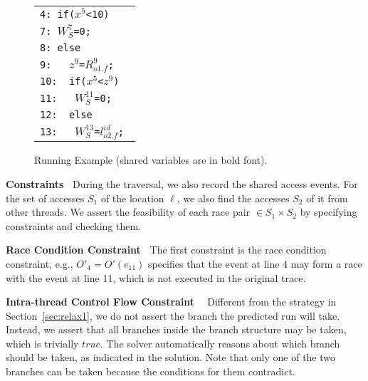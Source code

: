 \begin{figure}
\centering
\begin{tabular}{l}
 {\tt 4: if($x^5$<10)}  \\ %
{\tt 7: $W^7_{S}$=0;}   \\%
 {{\tt 8:  else}}   \\ %
 {{\tt 9: \ \ $z^9$=$R^{9}_{o1.f}$;}}  \\ %
 {{\tt 10: \ if($x^5$<$z^9$)}}  \\%
 {{\tt 11: \ \ $W^{11}_{S}$=0;}} \\%
 {{\tt 12: \ else }}  \\%
 {{\tt 13: \ \ $W^{13}_{S}$=$l^{id}_{o2.f}$; }}   \\%
\end{tabular}
\caption{Running Example (shared variables are in bold font). }
\label{fig:pathssa}
\end{figure}






{\bf Constraints\ } During the traversal, we also record the shared access events.  For the set of accesses $S_1$ of the location $\ell$, we also find the accesses $S_2$ of it from other threads. We assert the feasibility of each race pair $\in S_1 \times S_2$ by specifying constraints and checking them.

{\bf Race Condition Constraint\ }  The first constraint is the race condition constraint, e.g., $O'_{4}=O'(e_11)$ specifies that the event at line 4 may form a race with the event at line 11, which is not executed in the original trace.

{\bf Intra-thread Control Flow Constraint \ } Different from the strategy in Section~\ref{sec:relax1}, we do not assert the branch the predicted run will take. Instead, we assert that all branches inside the branch structure may be taken, which is trivially $true$. The solver automatically reasons about which branch should be taken, as indicated in the solution. Note that only one of the two branches can be taken because the conditions for them contradict.

